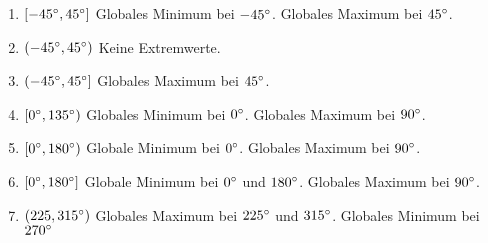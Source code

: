 \item 

\begin{enumerate}
	\item $[-\SI{45}{\degree},\SI{45}{\degree}]$ Globales Minimum bei $-\SI{45}{\degree}$. Globales Maximum bei $\SI{45}{\degree}$.
	\item $(-\SI{45}{\degree},\SI{45}{\degree})$ Keine Extremwerte.
	\item $(-\SI{45}{\degree},\SI{45}{\degree}]$ Globales Maximum bei $\SI{45}{\degree}$.
	\item $[\SI{0}{\degree},\SI{135}{\degree})$ Globales Minimum bei $\SI{0}{\degree}$. Globales Maximum bei $\SI{90}{\degree}$.
	\item $[\SI{0}{\degree},\SI{180}{\degree})$ Globale Minimum bei $\SI{0}{\degree}$. Globales Maximum bei $\SI{90}{\degree}$.
	\item $[\SI{0}{\degree},\SI{180}{\degree}]$ Globale Minimum bei $\SI{0}{\degree}$ und $\SI{180}{\degree}$. Globales Maximum bei $\SI{90}{\degree}$.
	\item $(225,\SI{315}{\degree})$ Globales Maximum bei $\SI{225}{\degree}$ und $\SI{315}{\degree}$. Globales Minimum bei $\SI{270}{\degree}$
\end{enumerate}

